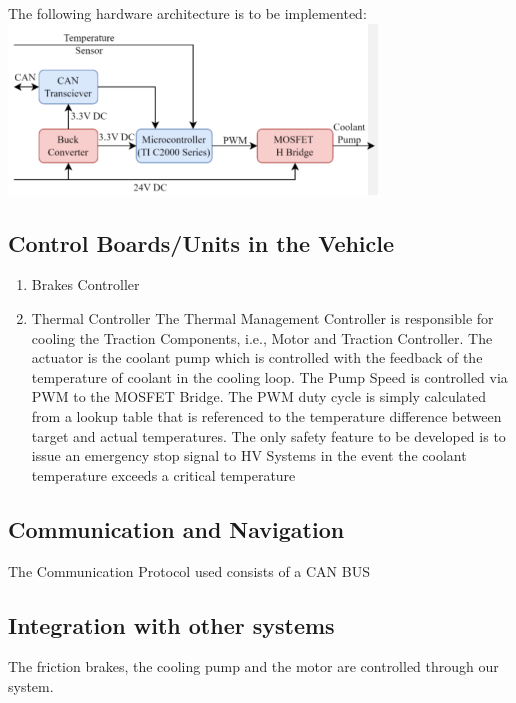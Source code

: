 The following hardware architecture is to be implemented:
\includegraphics[width=\textwidth]{texfiles/elec/eimg/Thermal_architecture}

\subsection{Control Boards/Units in the Vehicle}

\begin{enumerate}
    \item Brakes Controller

    \item Thermal Controller
The Thermal Management Controller is responsible for cooling the Traction Components, i.e., Motor and Traction Controller. The actuator is the coolant pump which is controlled  with the feedback of the temperature of coolant in the cooling loop.  The Pump Speed is controlled via PWM to the MOSFET Bridge. The PWM duty cycle is simply calculated from a lookup table that is referenced to the temperature difference between target and actual temperatures. The only safety feature to be developed is to issue an emergency stop signal to HV Systems in the event the coolant temperature exceeds a critical
temperature

\end{enumerate}

\subsection{Communication and Navigation}
The Communication Protocol used consists of a CAN BUS

\subsection{Integration with other systems}
The friction brakes, the cooling pump and the motor are controlled through our system.

